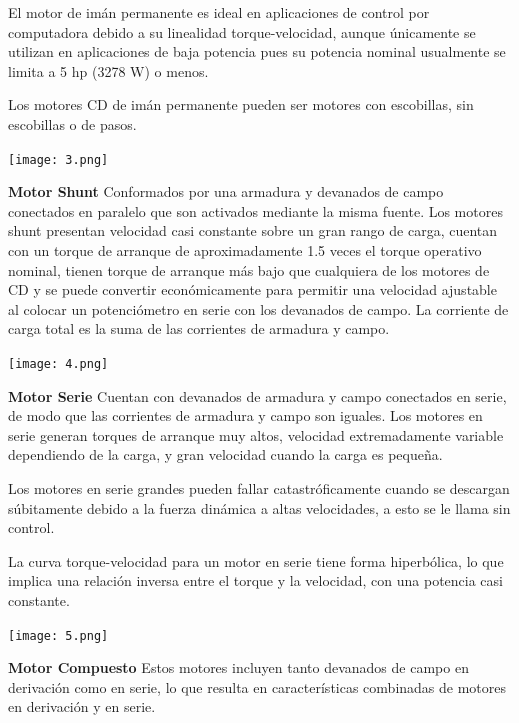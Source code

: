 \documentclass[10pt,a4paper]{article}
\begin{document}
El motor de imán permanente es ideal en aplicaciones de control por computadora debido a su linealidad torque-velocidad, aunque únicamente se utilizan en aplicaciones de baja potencia pues su potencia nominal usualmente se limita a 5 hp (3278 W) o menos.

Los motores CD de imán permanente pueden ser motores con escobillas, sin escobillas o de pasos.\\

\begin{center}
\texttt{[image: 3.png]} 
\end{center}

\textbf{Motor Shunt}
Conformados por una armadura y devanados de campo conectados en paralelo que son activados mediante la misma fuente. Los motores shunt presentan velocidad casi constante sobre un gran rango de carga, cuentan con un torque de arranque de aproximadamente 1.5 veces el torque operativo nominal, tienen torque de arranque más bajo que cualquiera de los motores de CD y se puede convertir económicamente para permitir una velocidad ajustable al colocar un potenciómetro en serie con los devanados de campo. La corriente de carga total es la suma de las corrientes de armadura y campo.\\

\begin{center}
\texttt{[image: 4.png]} 
\end{center}

\textbf{Motor Serie}
Cuentan con devanados de armadura y campo conectados en serie, de modo que las corrientes de armadura y campo son iguales. Los motores en serie generan torques de arranque muy altos, velocidad extremadamente variable dependiendo de la carga, y gran velocidad cuando la carga es pequeña.

Los motores en serie grandes pueden fallar catastróficamente cuando se descargan súbitamente debido a la fuerza dinámica a altas velocidades, a esto se le llama sin control.  

La curva torque-velocidad para un motor en serie tiene forma hiperbólica, lo que implica una relación inversa entre el torque y la velocidad, con una potencia casi constante.\\

\begin{center}
\texttt{[image: 5.png]} 
\end{center}

\textbf{Motor Compuesto}
Estos motores incluyen tanto devanados de campo en derivación como en serie, lo que resulta en características combinadas de motores en derivación y en serie.
\end{document}
